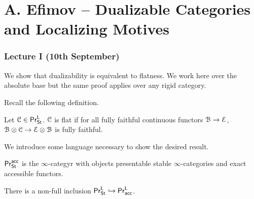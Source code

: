 \part*{A. Efimov -- Dualizable Categories and Localizing Motives}
\section{Lecture I (10th September)}\label{sec: Efimov I}
We show that dualizability is equivalent to flatness. We work here over the absolute base but the same proof applies over any rigid category. 

Recall the following definition. 
\begin{definition}[Flat]\label{def: flat}
    Let $\EuScript{C}\in\mathsf{Pr}^{\mathsf{L}}_{\mathsf{St}}$. $\EuScript{C}$ is flat if for all fully faithful continuous functors $\EuScript{B}\to\EuScript{E}$, $\EuScript{B}\otimes\EuScript{C}\to\EuScript{E}\otimes\EuScript{B}$ is fully faithful. 
\end{definition}
We introduce some language necessary to show the desired result. 
\begin{definition}[$\catPr^{\acc}_{\St}$]\label{def: PrLacc}
    $\catPr^{\acc}_{\St}$ is the $\infty$-categyr with objects presentable stable $\infty$-categories and exact accessible functors. 
\end{definition}
\begin{remark}
    There is a non-full inclusion $\mathsf{Pr}^{\mathsf{L}}_{\mathsf{St}}\hookrightarrow\mathsf{Pr}^{\mathsf{L}}_{\mathsf{acc}}$. 
\end{remark}

